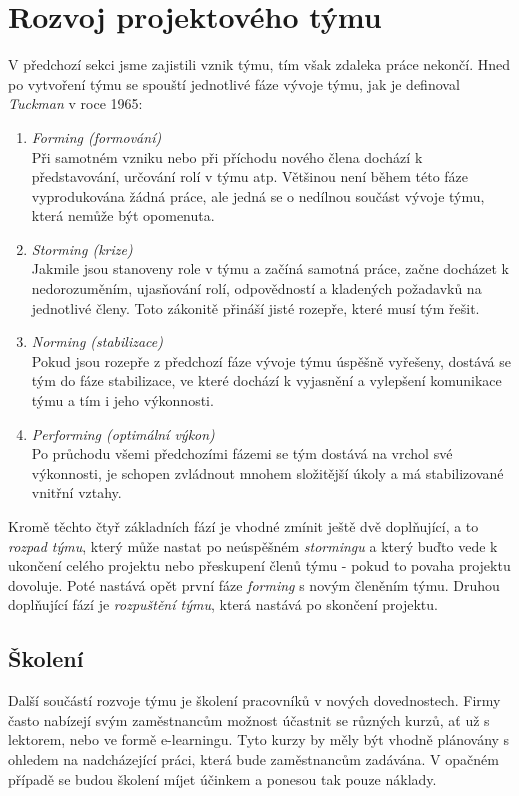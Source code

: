 
\section{Rozvoj projektového týmu}

V předchozí sekci jsme zajistili vznik týmu, tím však zdaleka práce nekončí. Hned po vytvoření týmu se spouští jednotlivé fáze vývoje týmu, jak je definoval \emph{Tuckman} \cite{tuckman} v roce 1965:
\begin{enumerate}
	\item \emph{Forming (formování)}\\Při samotném vzniku nebo při příchodu nového člena dochází k představování, určování rolí v týmu atp. Většinou není během této fáze vyprodukována žádná práce, ale jedná se o nedílnou součást vývoje týmu, která nemůže být opomenuta.
	\item \emph{Storming (krize)}\\Jakmile jsou stanoveny role v týmu a začíná samotná práce, začne docházet k nedorozuměním, ujasňování rolí, odpovědností a kladených požadavků na jednotlivé členy. Toto zákonitě přináší jisté rozepře, které musí tým řešit.
	\item \emph{Norming (stabilizace)}\\Pokud jsou rozepře z předchozí fáze vývoje týmu úspěšně vyřešeny, dostává se tým do fáze stabilizace, ve které dochází k vyjasnění a vylepšení komunikace týmu a tím i jeho výkonnosti.
	\item \emph{Performing (optimální výkon)}\\Po průchodu všemi předchozími fázemi se tým dostává na vrchol své výkonnosti, je schopen zvládnout mnohem složitější úkoly a má stabilizované vnitřní vztahy.
\end{enumerate}
Kromě těchto čtyř základních fází je vhodné zmínit ještě dvě doplňující, a to \emph{rozpad týmu}, který může nastat po neúspěšném \emph{stormingu} a který buďto vede k ukončení celého projektu nebo přeskupení členů týmu - pokud to povaha projektu dovoluje. Poté nastává opět první fáze \emph{forming} s novým členěním týmu. Druhou doplňující fází je \emph{rozpuštění týmu}, která nastává po skončení projektu.

\subsection{Školení}
Další součástí rozvoje týmu je školení pracovníků v nových dovednostech. Firmy často nabízejí svým zaměstnancům možnost účastnit se různých kurzů, ať už s lektorem, nebo ve formě e-learningu. Tyto kurzy by měly být vhodně plánovány s ohledem na nadcházející práci, která bude zaměstnancům zadávána. V opačném případě se budou školení míjet účinkem a ponesou tak pouze náklady.

